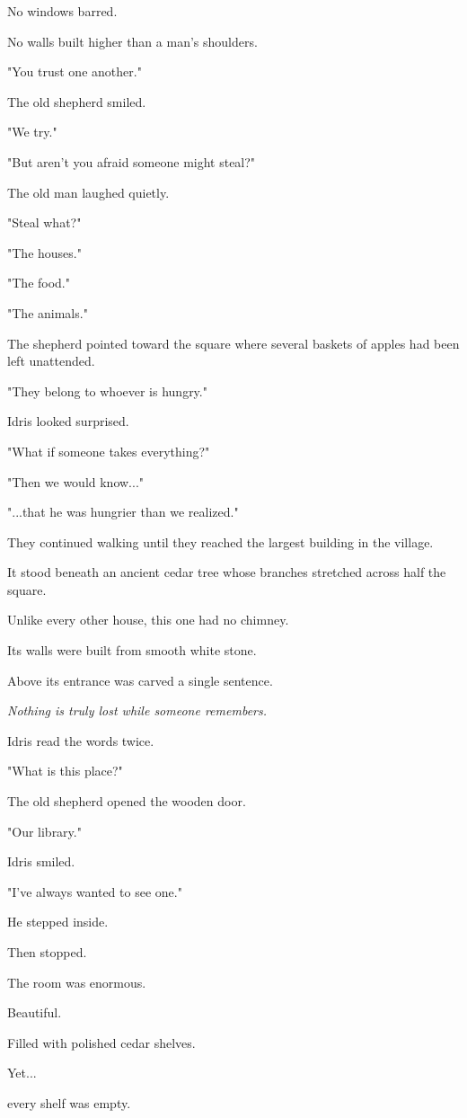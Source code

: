 \documentclass[12pt,openany]{book}
\begin{document}
No windows barred.

No walls built higher than a man's shoulders.

"You trust one another."

The old shepherd smiled.

"We try."

"But aren't you afraid someone might steal?"

The old man laughed quietly.

"Steal what?"

"The houses."

"The food."

"The animals."

The shepherd pointed toward the square where several baskets of apples had been left unattended.

"They belong to whoever is hungry."

Idris looked surprised.

"What if someone takes everything?"

"Then we would know..."

"...that he was hungrier than we realized."

They continued walking until they reached the largest building in the village.

It stood beneath an ancient cedar tree whose branches stretched across half the square.

Unlike every other house, this one had no chimney.

Its walls were built from smooth white stone.

Above its entrance was carved a single sentence.

\emph{Nothing is truly lost while someone remembers.}

Idris read the words twice.

"What is this place?"

The old shepherd opened the wooden door.

"Our library."

Idris smiled.

"I've always wanted to see one."

He stepped inside.

Then stopped.

The room was enormous.

Beautiful.

Filled with polished cedar shelves.

Yet...

every shelf was empty.
\end{document}
